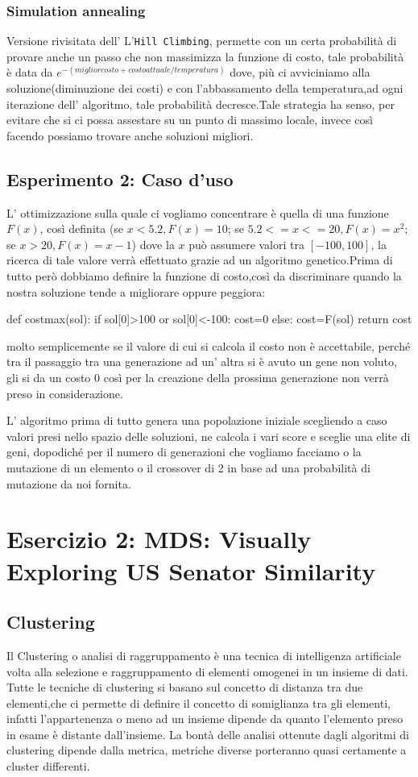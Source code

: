 			\subsubsection{Simulation annealing}
				Versione rivisitata dell' L'\texttt{Hill Climbing}, permette con un certa probabilità di provare anche un passo che non massimizza la funzione di costo, tale probabilità è data da $e^{-(migliorcosto+costoattuale/temperatura)}$ dove, più ci avviciniamo alla soluzione(diminuzione dei costi) e con l'abbassamento della temperatura,ad ogni iterazione dell' algoritmo, tale probabilità decresce.Tale strategia ha senso, per evitare che si ci possa assestare su un punto di massimo locale, invece così facendo possiamo trovare anche soluzioni migliori.
		\subsection{Esperimento 2: Caso d'uso}
			L' ottimizzazione sulla quale ci vogliamo concentrare è quella di una funzione $F(x)$, così definita (se $x<5.2,F(x)=10$; se $5.2<=x<=20,F(x)=x^2$; se $x>20,F(x)=x-1$) dove la $x$ può assumere valori tra $[-100,100]$, la ricerca di tale valore verrà effettuato grazie ad un algoritmo genetico.Prima di tutto però dobbiamo definire la funzione di costo,così da discriminare quando la nostra soluzione tende a migliorare oppure peggiora:
			\begin{python}
		def costmax(sol):
			if sol[0]>100 or sol[0]<-100:
				cost=0
			else:
				cost=F(sol)
		return cost  
			\end{python}
			molto semplicemente se il valore di cui si calcola il costo non è accettabile, perché tra il passaggio tra una generazione ad un' altra si è avuto un gene non voluto, gli si da un costo 0 così per la creazione della prossima generazione non verrà preso in considerazione.\par
			L' algoritmo prima di tutto genera una popolazione iniziale scegliendo a caso valori presi nello spazio delle soluzioni, ne calcola i vari score e sceglie una elite di geni, dopodiché per il numero di generazioni che vogliamo facciamo o la mutazione di un elemento o il crossover di 2 in base ad una probabilità di mutazione da noi fornita.
	\section{Esercizio 2: MDS: Visually Exploring US Senator Similarity}
		\label{sec:es2}
			\subsection{Clustering}
				Il Clustering o analisi di raggruppamento è una tecnica di intelligenza artificiale volta alla selezione e raggruppamento di elementi omogenei in un insieme di dati. Tutte le tecniche di clustering si basano sul concetto di distanza tra due elementi,che ci permette di definire il concetto di somiglianza tra gli elementi, infatti l'appartenenza o meno ad un insieme dipende da quanto l'elemento preso in esame è distante dall'insieme. La bontà delle analisi ottenute dagli algoritmi di clustering dipende dalla metrica, metriche diverse porteranno quasi certamente a cluster differenti.
				
